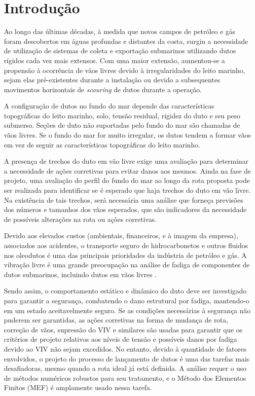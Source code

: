\chapter{Introdução}


Ao longo das últimas décadas, à medida que novos campos de petróleo e gás foram descobertos em águas profundas e distantes da costa, surgiu a necessidade de utilização de sistemas de coleta e exportação submarinos utilizando dutos rígidos cada vez mais extensos.
Com uma maior extensão, aumentou-se a propensão à ocorrência de vãos livres devido à irregularidades do leito marinho, sejam elas pré-existentes durante a instalação ou devido a subsequentes movimentos horizontais de \textit{scouring} de dutos durante a operação.

A configuração de dutos no fundo do mar depende das características topográficas do leito marinho, solo, tensão residual, rigidez do duto e seu peso submerso.
Seções de duto não suportadas pelo fundo do mar são chamadas de vãos livres.
Se o fundo do mar for muito irregular, os dutos tendem a formar vãos em vez de seguir as características topográficas do leito marinho.

A presença de trechos do duto em vão livre exige uma avaliação para determinar a necessidade de ações corretivas para evitar danos aos mesmos. Ainda na fase de projeto, uma avaliação do perfil do fundo do mar ao longo da rota proposta pode ser realizada para identificar se é esperado que haja trechos do duto em vão livre.
Na existência de tais trechos, será necessária uma análise que forneça previsões dos números e tamanhos dos vãos esperados, que são indicadores da necessidade de possíveis alterações na rota ou ações corretivas.

Devido aos elevados custos (ambientais, financeiros, e à imagem da empresa), associados aos acidentes, o transporte seguro de hidrocarbonetos e outros fluidos nos oleodutos é uma das principais prioridades da indústria de petróleo e gás. A vibração livre é uma grande preocupação na análise de fadiga de componentes de dutos submarinos, incluindo dutos em vãos livres \cite{Gamino2013}.

Sendo assim, o comportamento estático e dinâmico do duto deve ser investigado para garantir a segurança, combatendo o dano estrutural por fadiga, mantendo-o em um estado aceitavelmente seguro.
Se as condições necessárias à segurança não puderem ser garantidas, as ações corretivas na forma de mudança de rota, correção de vãos, supressão do VIV e similares são usadas para garantir que os critérios de projeto relativos aos níveis de tensão e possíveis danos por fadiga devido ao VIV não sejam excedidos.
No entanto, devido à quantidade de fatores envolvidos, o projeto do processo de lançamento de dutos é uma das tarefas mais desafiadoras, mesmo quando a rota ideal já está definida.
A análise requer o uso de métodos numéricos robustos para seu tratamento, e o Método dos Elementos Finitos (MEF) é amplamente usado nessa tarefa.

